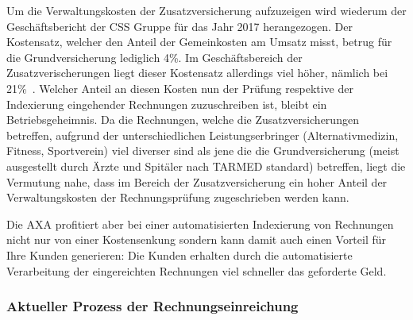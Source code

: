 Um die Verwaltungskosten der Zusatzversicherung aufzuzeigen wird wiederum der Ge\-schäfts\-be\-richt der CSS Gruppe für das Jahr 2017 herangezogen. Der Kostensatz, welcher den Anteil der Gemeinkosten am Umsatz misst, betrug für die Grundversicherung lediglich 4\%. Im Geschäftsbereich der Zusatzverischerungen liegt dieser Kostensatz allerdings viel höher, nämlich bei 21\%~\autocite{CSSGruppe2018}. Welcher Anteil an diesen Kosten nun der Prüfung respektive der Indexierung eingehender Rechnungen zuzuschreiben ist, bleibt ein Betriebsgeheimnis. Da die Rechnungen, welche die Zusatzversicherungen betreffen, aufgrund der unterschiedlichen Leistungserbringer (Alternativmedizin, Fitness, Sportverein) viel diverser sind als jene die die Grundversicherung (meist ausgestellt durch Ärzte und Spitäler nach TARMED standard) betreffen, liegt die Vermutung nahe, dass im Bereich der Zusatzversicherung ein hoher Anteil der Verwaltungskosten der Rechnungsprüfung zugeschrieben werden kann.

Die AXA profitiert aber bei einer automatisierten Indexierung von Rechnungen nicht nur von einer Kostensenkung sondern kann damit auch einen Vorteil für Ihre Kunden generieren: Die Kunden erhalten durch die automatisierte Verarbeitung der eingereichten Rechnungen viel schneller das geforderte Geld.




\subsubsection{Aktueller Prozess der Rechnungseinreichung}

